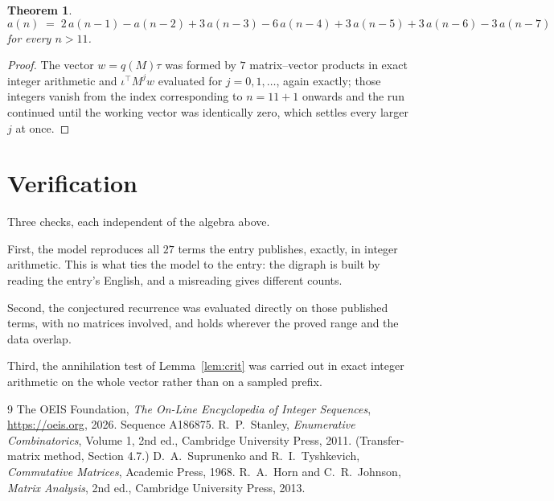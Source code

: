 \documentclass[11pt,a4paper]{article}
\theoremstyle{plain}
\newtheorem{theorem}{Theorem}
\theoremstyle{definition}
\begin{document}
\begin{theorem}
\[
a(n)\;=\;2\,a(n-1) - a(n-2) + 3\,a(n-3) - 6\,a(n-4) + 3\,a(n-5) + 3\,a(n-6) - 3\,a(n-7)
\]
for every $n>11$.
\end{theorem}

\begin{proof}
The vector $w=q(M)\tau$ was formed by $7$ matrix--vector products in exact integer
arithmetic and $\iota^{\!\top}M^{j}w$ evaluated for $j=0,1,\dots$, again exactly; those
integers vanish from the index corresponding to $n=11+1$ onwards and the run continued
until the working vector was identically zero, which settles every larger $j$ at once.
\end{proof}

\section{Verification}

Three checks, each independent of the algebra above.

First, the model reproduces all $27$ terms the entry publishes, exactly, in integer
arithmetic. This is what ties the model to the entry: the digraph is built by reading the
entry's English, and a misreading gives different counts.

Second, the conjectured recurrence was evaluated directly on those published terms, with no
matrices involved, and holds wherever the proved range and the data overlap.

Third, the annihilation test of Lemma~\ref{lem:crit} was carried out in exact integer
arithmetic on the whole vector rather than on a sampled prefix.

\begin{thebibliography}{9}
 The OEIS Foundation, \emph{The On-Line Encyclopedia of Integer
Sequences}, \url{https://oeis.org}, 2026. Sequence A186875.
 R.~P.~Stanley, \emph{Enumerative Combinatorics}, Volume 1, 2nd ed.,
Cambridge University Press, 2011. (Transfer-matrix method, Section 4.7.)
 D.~A.~Suprunenko and R.~I.~Tyshkevich, \emph{Commutative Matrices},
Academic Press, 1968.
 R.~A.~Horn and C.~R.~Johnson, \emph{Matrix Analysis}, 2nd ed., Cambridge
University Press, 2013.
\end{thebibliography}
\end{document}
